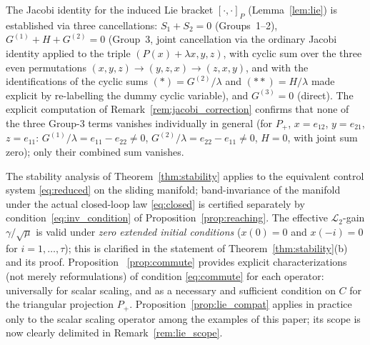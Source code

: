\documentclass[10pt]{amsart}
\numberwithin{equation}{section}
\begin{document}
The Jacobi identity for the induced Lie bracket $[\cdot,\cdot]_P$ (Lemma~\ref{lem:lie})
is established via three cancellations: $S_1+S_2=0$ (Groups~1--2),
$G^{(1)}+H+G^{(2)}=0$ (Group~3, joint cancellation via the ordinary Jacobi identity
applied to the triple $(P(x)+\lambda x, y, z)$, with cyclic sum over the three even
permutations $(x,y,z)\to(y,z,x)\to(z,x,y)$, and with the identifications of the cyclic
sums $(*) = G^{(2)}/\lambda$ and $(**) = H/\lambda$ made explicit by re-labelling the
dummy cyclic variable), and $G^{(3)}=0$ (direct). The explicit computation of
Remark~\ref{rem:jacobi_correction} confirms that none of the three Group-3 terms
vanishes individually in general (for $P_+$, $x=e_{12}$, $y=e_{21}$, $z=e_{11}$:
$G^{(1)}/\lambda = e_{11}-e_{22} \neq 0$, $G^{(2)}/\lambda = e_{22}-e_{11} \neq 0$,
$H = 0$, with joint sum zero); only their combined sum vanishes.

The stability analysis of Theorem~\ref{thm:stability} applies to the equivalent control
system \eqref{eq:reduced} on the sliding manifold; band-invariance of the manifold under
the actual closed-loop law \eqref{eq:closed} is certified separately by
condition~\eqref{eq:inv_condition} of Proposition~\ref{prop:reaching}. The effective
$\mathcal{L}_2$-gain $\gamma/\sqrt{\mu}$ is valid under \emph{zero extended initial
conditions} ($x(0)=0$ and $x(-i)=0$ for $i=1,\ldots,\tau$); this is clarified in
the statement of Theorem~\ref{thm:stability}(b) and its proof. Proposition~%
\ref{prop:commute} provides explicit characterizations (not merely reformulations)
of condition \eqref{eq:commute} for each operator: universally for scalar scaling,
and as a necessary and sufficient condition on $C$ for the triangular projection $P_+$.
Proposition~\ref{prop:lie_compat} applies in practice only to the scalar scaling
operator among the examples of this paper; its scope is now clearly delimited in
Remark~\ref{rem:lie_scope}.
\end{document}
